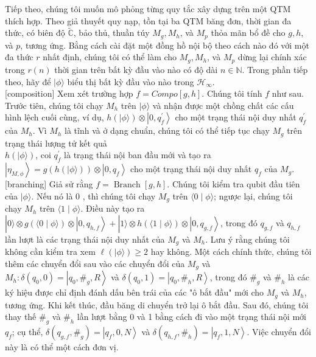 \documentclass[10pt]{article}
\begin{document}
Tiếp theo, chúng tôi muốn mô phỏng từng quy tắc xây dựng trên một QTM thích hợp. Theo giả thuyết quy nạp, tồn tại ba QTM băng đơn, thời gian đa thức, có biên độ $\tilde{\mathbb{C}}$, bảo thủ, thuần túy $M_{g}, M_{h}$, và $M_{p}$ thỏa mãn bổ đề cho $g, h$, và $p$, tương ứng. Bằng cách cài đặt một đồng hồ nội bộ theo cách nào đó với một đa thức $r$ nhất định, chúng tôi có thể làm cho $M_{g}, M_{h}$, và $M_{p}$ dừng lại chính xác trong $r(n)$ thời gian trên bất kỳ đầu vào nào có độ dài $n \in \mathbb{N}$. Trong phần tiếp theo, hãy để $|\phi\rangle$ biểu thị bất kỳ đầu vào nào trong $\mathcal{H}_{\infty}$.\\[0pt]
[composition] Xem xét trường hợp $f=C o m p o[g, h]$. Chúng tôi tính $f$ như sau. Trước tiên, chúng tôi chạy $M_{h}$ trên $|\phi\rangle$ và nhận được một chồng chất các cấu hình lệch cuối cùng, ví dụ, $h(|\phi\rangle) \otimes\left|0, q_{f}^{\prime}\right\rangle$ cho một trạng thái nội duy nhất $q_{f}^{\prime}$ của $M_{h}$. Vì $M_{h}$ là tĩnh và ở dạng chuẩn, chúng tôi có thể tiếp tục chạy $M_{g}$ trên trạng thái lượng tử kết quả\\
$h(|\phi\rangle)$, coi $q_{f}^{\prime}$ là trạng thái nội ban đầu mới và tạo ra $\left|\eta_{M, \phi}\right\rangle=g(h(|\phi\rangle)) \otimes\left|0, q_{f}\right\rangle$ cho một trạng thái nội duy nhất $q_{f}$ của $M_{g}$.\\[0pt]
[branching] Giả sử rằng $f=\operatorname{Branch}[g, h]$. Chúng tôi kiểm tra qubit đầu tiên của $|\phi\rangle$. Nếu nó là 0 , thì chúng tôi chạy $M_{g}$ trên $\langle 0 \mid \phi\rangle$; ngược lại, chúng tôi chạy $M_{h}$ trên $\langle 1 \mid \phi\rangle$. Điều này tạo ra $|0\rangle \otimes g(\langle 0 \mid \phi\rangle) \otimes\left|0, q_{h, f}\right\rangle+|1\rangle \otimes h(\langle 1 \mid \phi\rangle) \otimes\left|0, q_{g, f}\right\rangle$, trong đó $q_{g, f}$ và $q_{h, f}$ lần lượt là các trạng thái nội duy nhất của $M_{g}$ và $M_{h}$. Lưu ý rằng chúng tôi không cần kiểm tra xem $\ell(|\phi\rangle) \geq 2$ hay không. Một cách chính thức, chúng tôi thêm các chuyển đổi sau vào các chuyển đổi của $M_{g}$ và $M_{h}: \delta\left(q_{0}, 0\right)=\left|q_{0}, \#_{g}, R\right\rangle$ và $\delta\left(q_{0}, 1\right)=\left|q_{0}, \#_{h}, R\right\rangle$, trong đó $\#_{g}$ và $\#_{h}$ là các ký hiệu được chỉ định đánh dấu bên trái của các "ô bắt đầu" mới cho $M_{g}$ và $M_{h}$, tương ứng. Khi kết thúc, đầu băng di chuyển trở lại ô bắt đầu. Sau đó, chúng tôi thay thế $\#_{g}$ và $\#_{h}$ lần lượt bằng 0 và 1 bằng cách đi vào một trạng thái nội mới $q_{f}$; cụ thể, $\delta\left(q_{g, f}, \#_{g}\right)=\left|q_{f}, 0, N\right\rangle$ và $\delta\left(q_{h, f}, \#_{h}\right)=\left|q_{f}, 1, N\right\rangle$. Việc chuyển đổi này là có thể một cách đơn vị.\\[0pt]
\end{document}
